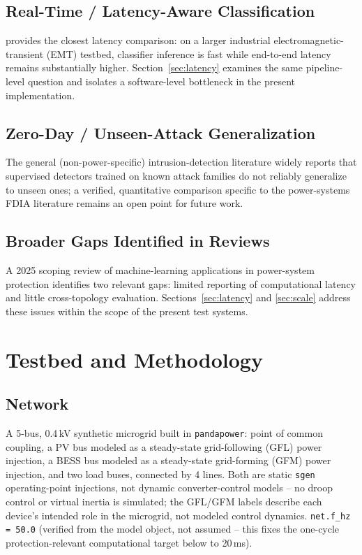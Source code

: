 \documentclass[conference]{IEEEtran}
\begin{document}
\subsection{Real-Time / Latency-Aware Classification}
\cite{abukhousa2026latency} provides the closest latency comparison: on a larger industrial electromagnetic-transient (EMT) testbed, classifier inference is fast while end-to-end latency remains substantially higher. Section~\ref{sec:latency} examines the same pipeline-level question and isolates a software-level bottleneck in the present implementation.

\subsection{Zero-Day / Unseen-Attack Generalization}
The general (non-power-specific) intrusion-detection literature widely reports that supervised detectors trained on known attack families do not reliably generalize to unseen ones; a verified, quantitative comparison specific to the power-systems FDIA literature remains an open point for future work.

\subsection{Broader Gaps Identified in Reviews}
A 2025 scoping review of machine-learning applications in power-system protection \cite{oelhaf2025scoping} identifies two relevant gaps: limited reporting of computational latency and little cross-topology evaluation. Sections~\ref{sec:latency} and \ref{sec:scale} address these issues within the scope of the present test systems.

\section{Testbed and Methodology}
\label{sec:method}

\subsection{Network}
A 5-bus, 0.4\,kV synthetic microgrid built in \texttt{pandapower}: point of common coupling, a PV bus modeled as a steady-state grid-following (GFL) power injection, a BESS bus modeled as a steady-state grid-forming (GFM) power injection, and two load buses, connected by 4 lines. Both are static \texttt{sgen} operating-point injections, not dynamic converter-control models -- no droop control or virtual inertia is simulated; the GFL/GFM labels describe each device's intended role in the microgrid, not modeled control dynamics. \texttt{net.f\_hz = 50.0} (verified from the model object, not assumed -- this fixes the one-cycle protection-relevant computational target below to 20\,ms).
\end{document}
